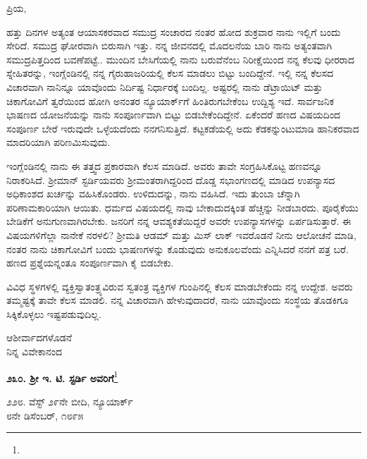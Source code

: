 \noindent
ಪ್ರಿಯ,

ಹತ್ತು ದಿನಗಳ ಅತ್ಯಂತ ಆಯಾಸಕರವಾದ ಸಮುದ್ರ ಸಂಚಾರದ ನಂತರ ಹೋದ ಶುಕ್ರವಾರ ನಾನು ಇಲ್ಲಿಗೆ ಬಂದು ಸೇರಿದೆ. ಸಮುದ್ರ ಘೋರವಾಗಿ ಬಿರುಸಾಗಿ ಇತ್ತು. ನನ್ನ ಜೀವನದಲ್ಲಿ ಮೊದಲನೆಯ ಬಾರಿ ನಾನು ಅತ್ಯಂತವಾಗಿ ಸಮುದ್ರಪಿತ್ತದಿಂದ ಬವಣೆಪಟ್ಟೆ.. ಮುಂದಿನ ಬೇಸಿಗೆಯಲ್ಲಿ ನಾನು ಬರುವೆನೆಂಬ ನಿರೀಕ್ಷೆಯಿಂದ ನನ್ನ ಕೆಲವು ಧೀರರಾದ ಸ್ನೇಹಿತರನ್ನು, ಇಂಗ್ಲೆಂಡಿನಲ್ಲಿ ನನ್ನ ಗೈರುಹಾಜರಿಯಲ್ಲಿ ಕೆಲಸ ಮಾಡಲು ಬಿಟ್ಟು ಬಂದಿದ್ದೇನೆ. ಇಲ್ಲಿ ನನ್ನ ಕೆಲಸದ ವಿಚಾರವಾಗಿ ನಾನಿನ್ನೂ ಯಾವೊಂದು ನಿರ್ದಿಷ್ಟ ನಿರ್ಧಾರಕ್ಕೆ ಬಂದಿಲ್ಲ. ಅಷ್ಟರಲ್ಲಿ ನಾನು ಡೆಟ್ರಾಯಿಟ್ ಮತ್ತು ಚಿಕಾಗೋವಿಗೆ ತ್ವರೆಯಿಂದ ಹೋಗಿ ಅನಂತರ ನ್ಯೂಯಾರ್ಕ್‌ಗೆ ಹಿಂತಿರುಗಬೇಕೆಂಬ ಉದ್ದಿಶ್ಯ ಇದೆ. ಸಾರ್ವಜನಿಕ ಭಾಷಣದ ಯೋಜನೆಯನ್ನು ನಾನು ಸಂಪೂರ್ಣವಾಗಿ ಬಿಟ್ಟು ಬಿಡಬೇಕೆಂದಿದ್ದೇನೆ. ಏಕೆಂದರೆ ಹಣದ ವಿಷಯದಿಂದ ಸಂಪೂರ್ಣ ಬೇರೆ ಇರುವುದೇ ಒಳ್ಳೆಯದೆಂದು ನನಗನಿಸುತ್ತಿದೆ. ಕಟ್ಟಕಡೆಯಲ್ಲಿ ಅದು ಕೆಡಕನ್ನುಂಟುಮಾಡಿ ಹಾನಿಕರವಾದ ಮಾದರಿಯಾಗಿ ಪರಿಣಮಿಸುವುದು.

ಇಂಗ್ಲೆಂಡಿನಲ್ಲಿ ನಾನು ಈ ತತ್ತ್ವದ ಪ್ರಕಾರವಾಗಿ ಕೆಲಸ ಮಾಡಿದೆ. ಅವರು ತಾವೇ ಸಂಗ್ರಹಿಸಿಕೊಟ್ಟ ಹಣವನ್ನೂ ನಿರಾಕರಿಸಿದೆ. ಶ‍್ರೀಮಾನ್ ಸ್ಟರ್ಡಿಯವರು ಶ‍್ರೀಮಂತರಾಗಿದ್ದರಿಂದ ದೊಡ್ಡ ಸಭಾಂಗಣದಲ್ಲಿ ಮಾಡಿದ ಉಪನ್ಯಾಸದ ಅಧಿಕಾಂಶದ ಖರ್ಚನ್ನು ವಹಿಸಿಕೊಂಡರು. ಉಳಿದುದನ್ನು, ನಾನು ವಹಿಸಿದೆ. ಇದು ತುಂಬಾ ಚೆನ್ನಾಗಿ ಪರಿಣಾಮಕಾರಿಯಾಗಿ ಆಯಿತು. ಧರ್ಮದ ವಿಷಯದಲ್ಲಿ ನಾವು ಬೇಕಾದುದಕ್ಕಿಂತ ಹೆಚ್ಚನ್ನು ನೀಡಬಾರದು. ಪೂರೈಕೆಯು ಬೇಡಿಕೆಗೆ ಅನುಗುಣವಾಗಿರಬೇಕು. ಜನರಿಗೆ ನನ್ನ ಆವಶ್ಯಕತೆಯಿದ್ದರೆ ಅವರೇ ಉಪನ್ಯಾಸಗಳನ್ನು ಏರ್ಪಡಿಸುತ್ತಾರೆ. ಈ ವಿಷಯಗಳಿಗೆಲ್ಲಾ ನಾನೇಕೆ ನರಳಲಿ? ಶ‍್ರೀಮತಿ ಆಡಮ್ ಮತ್ತು ಮಿಸ್ ಲಾಕ್ ಇವರೊಡನೆ ನೀನು ಆಲೋಚನೆ ಮಾಡಿ, ನಂತರ ನಾನು ಚಿಕಾಗೋವಿಗೆ ಬಂದು ಭಾಷಣಗಳನ್ನು ಕೊಡುವುದು ಅನುಕೂಲವೆಂದು ಎನ್ನಿಸಿದರೆ ನನಗೆ ಪತ್ರ ಬರೆ. ಹಣದ ಪ್ರಶ್ನೆಯನ್ನಂತೂ ಸಂಪೂರ್ಣವಾಗಿ ಕೈ ಬಿಡಬೇಕು.

ವಿವಿಧ ಸ್ಥಳಗಳಲ್ಲಿ ವ್ಯಕ್ತಿಸ್ವಾತಂತ್ರ್ಯವಿರುವ ಸ್ವತಂತ್ರ ವ್ಯಕ್ತಿಗಳ ಗುಂಪಿನಲ್ಲಿ ಕೆಲಸ ಮಾಡಬೇಕೆಂದು ನನ್ನ ಉದ್ದೇಶ. ಅವರು ತಮ್ಮಷ್ಟಕ್ಕೆ ತಾವೇ ಕೆಲಸ ಮಾಡಲಿ. ನನ್ನ ವಿಚಾರವಾಗಿ ಹೇಳುವುದಾದರೆ, ನಾನು ಯಾವೊಂದು ಸಂಸ್ಥೆಯ ತೊಡಕಿಗೂ ಸಿಕ್ಕಿಕೊಳ್ಳಲು ಇಷ್ಟಪಡುವುದಿಲ್ಲ.

\vspace{-0.5cm}

{\flushright
ಆಶೀರ್ವಾದಗಳೊಡನೆ\\ನಿನ್ನ ವಿವೇಕಾನಂದ\par}

\begin{center}
\textbf{೨೩೦. ಶ‍್ರೀ ಇ. ಟಿ. ಸ್ಟರ್ಡಿ ಅವರಿಗೆ}\footnote{}
\end{center}

\vspace{-0.5cm}

\begin{flushright}
೨೨೮. ವೆಸ್ಟ್ ೨೯ನೇ ಬೀದಿ, ನ್ಯೂಯಾರ್ಕ್\\೮ನೇ ಡಿಸೆಂಬರ್, ೧೮೯೫
\end{flushright}

